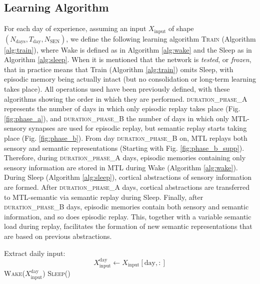 \documentclass{article}
\begin{document}
\subsection*{Learning Algorithm}
For each day of experience, assuming an input $X_\textrm{input}$ of shape $(N_\textrm{days}, T_\textrm{day}, N_\textrm{SEN})$, we define the following learning algorithm \textsc{Train} (Algorithm \ref{alg:train}), where \textrm{Wake} is defined as in Algorithm \ref{alg:wake} and the \textrm{Sleep} as in Algorithm \ref{alg:sleep}. When it is mentioned that the network is \textit{tested}, or \textit{frozen}, that in practice means that \textrm{Train} (Algorithm \ref{alg:train}) omits \textrm{Sleep}, with episodic memory being actually intact (but no consolidation or long-term learning takes place). All operations used have been previously defined, with these algorithms showing the order in which they are performed. \textsc{duration\_phase\_A} represents the number of days in which only episodic replay takes place (Fig. \ref{fig:phase_a}), and  \textsc{duration\_phase\_B} the number of days in which only MTL-sensory synapses are used for episodic replay, but semantic replay starts taking place (Fig. \ref{fig:phase_b}). From day \textsc{duration\_phase\_B} on, MTL replays both sensory and semantic representations (Starting with Fig. \ref{fig:phase_b_supp}). Therefore, during \textsc{duration\_phase\_A} days, episodic memories containing only sensory information are stored in MTL during Wake (Algorithm \ref{alg:wake}). During Sleep (Algorithm \ref{alg:sleep}), cortical abstractions of sensory information are formed. After \textsc{duration\_phase\_A} days, cortical abstractions are transferred to MTL-semantic via semantic replay during Sleep. Finally, after \textsc{duration\_phase\_B} days, episodic memories contain both sensory and semantic information, and so does episodic replay. This, together with a variable semantic load during replay, facilitates the formation of new semantic representations that are based on previous abstractions. 
\begin{algorithm}[h!]
\caption{Learning Algorithm Across Days}\label{alg:train}
\begin{algorithmic}[1]
        \State Extract daily input:
            \[
            X^{\textrm{day}}_\textrm{input} \gets X_\textrm{input}[\textrm{day},:]
            \]
        \State \textsc{Wake}($X^{\textrm{day}}_\textrm{input}$)
        \State \textsc{Sleep}()
    \EndFor
\EndFunction
\end{algorithmic}
\end{algorithm}
\end{document}
